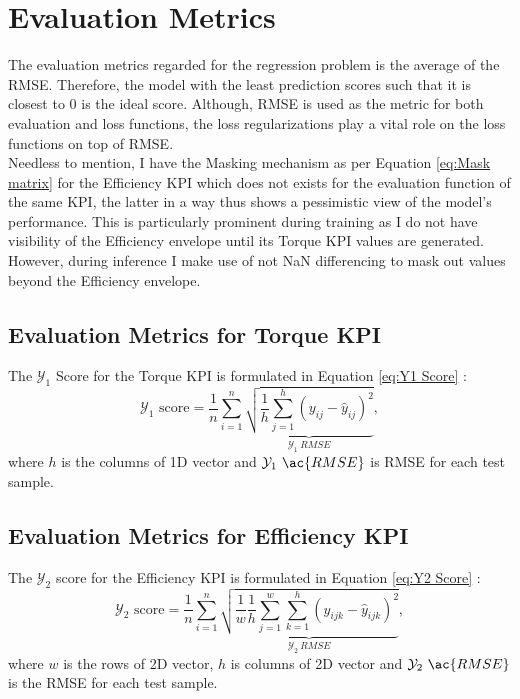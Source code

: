 \documentclass{report} %
\begin{document}
\section{Evaluation Metrics}
The evaluation metrics regarded for the regression problem is the average of the \ac{RMSE}. 
Therefore, the model with the least prediction scores such that it is closest to 0 is the ideal score. 
Although, \ac{RMSE} is used as the metric for both evaluation and loss functions, the loss regularizations play a vital role on the loss functions on top of \ac{RMSE}.\\
Needless to mention, I have the Masking mechanism as per Equation \ref{eq:Mask matrix} for the Efficiency \ac{KPI} which does not exists for the evaluation function of the 
same \ac{KPI}, the latter in a way thus shows a pessimistic view of the model's performance. This is particularly prominent during training as I do not have visibility of the 
Efficiency envelope until its Torque \ac{KPI} values are generated. However, during inference I make use of not \ac{NaN} differencing to mask out values beyond the Efficiency envelope. 

\subsection{Evaluation Metrics for Torque KPI}\label{subsec:Evaluation Metrics for 2D KPI}
The $\mathcal{Y}_1$ Score for the Torque \ac{KPI} is formulated in Equation \ref{eq:Y1 Score} :
\begin{equation}
\text{$\mathcal{Y}_1$ score} = \frac{1}{n} \sum_{i=1}^{n} \underbrace{ \sqrt{\frac{1}{h} \sum_{j=1}^{h} (y_{ij} - \hat{y}_{ij})^2}}_{\mathcal{Y}_1\ RMSE},
\label{eq:Y1 Score}
\end{equation}
where \(h\) is the columns of 1D vector and \(\mathcal{Y}_1\ \ac{RMSE}\) is \ac{RMSE} for each test sample.

\subsection{Evaluation Metrics for Efficiency KPI}\label{subsec:Evaluation Metrics for 3D KPI}
The $\mathcal{Y}_2$ score for the Efficiency \ac{KPI} is formulated in Equation \ref{eq:Y2 Score} :
\begin{equation}
    \text{$\mathcal{Y}_2$ score} = \frac{1}{n} \sum_{i=1}^{n} \underbrace{ \sqrt{\frac{1}{w} \frac{1}{h} \sum_{j=1}^{w} \sum_{k=1}^{h} (y_{ijk} - \hat{y}_{ijk})^2}}_{\mathcal{Y}_2\ RMSE},
    \label{eq:Y2 Score}
\end{equation}
where \(w\) is the rows of 2\ac{D} vector, \(h\) is columns of 2\ac{D} vector and \(\mathcal{Y}_2\ \ac{RMSE}\) is the \ac{RMSE} for each test sample.\\
\end{document}
